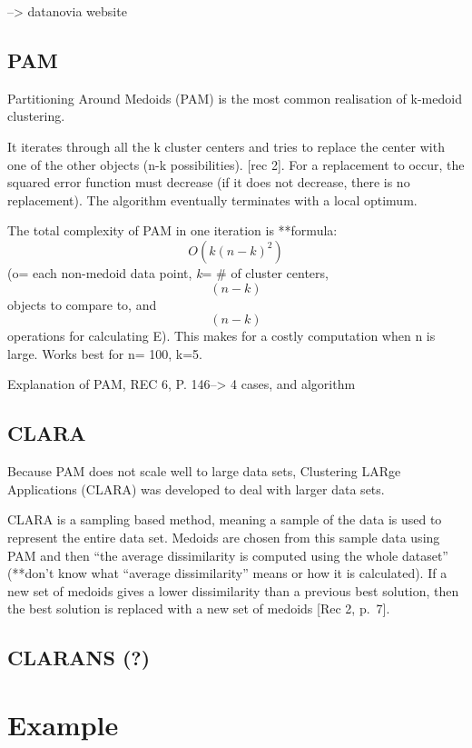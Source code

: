 \documentclass[12pt,twoside]{amherstthesis}
\begin{document}
  --\textgreater{} datanovia website
  
  \section{PAM}\label{pam}
  
  Partitioning Around Medoids (PAM) is the most common realisation of
  k-medoid clustering.
  
  It iterates through all the k cluster centers and tries to replace the
  center with one of the other objects (n-k possibilities). {[}rec 2{]}.
  For a replacement to occur, the squared error function must decrease (if
  it does not decrease, there is no replacement). The algorithm eventually
  terminates with a local optimum.
  
  The total complexity of PAM in one iteration is **formula:
  \[O(k(n-k)^2)\] (o= each non-medoid data point, \emph{k}= \# of cluster
  centers, \[(n-k)\] objects to compare to, and \[(n-k)\] operations for
  calculating E). This makes for a costly computation when n is large.
  Works best for n= 100, k=5.
  
  Explanation of PAM, REC 6, P. 146--\textgreater{} 4 cases, and algorithm
  
  \section{CLARA}\label{clara}
  
  Because PAM does not scale well to large data sets, Clustering LARge
  Applications (CLARA) was developed to deal with larger data sets.
  
  CLARA is a sampling based method, meaning a sample of the data is used
  to represent the entire data set. Medoids are chosen from this sample
  data using PAM and then ``the average dissimilarity is computed using
  the whole dataset'' (**don't know what ``average dissimilarity'' means
  or how it is calculated). If a new set of medoids gives a lower
  dissimilarity than a previous best solution, then the best solution is
  replaced with a new set of medoids {[}Rec 2, p.~7{]}.
  
  \section{CLARANS (?)}\label{clarans}
  
  \chapter{Example}\label{typeset-equ}
  
\end{document}
